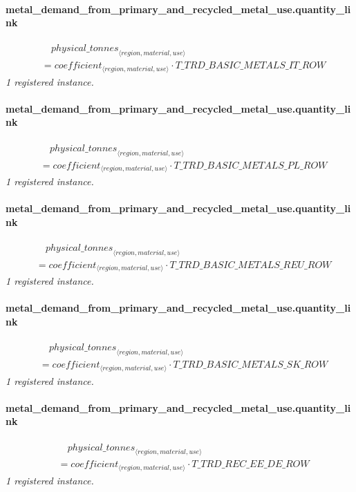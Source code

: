 \documentclass[11pt]{article}
\begin{document}
\paragraph{metal\_demand\_from\_primary\_and\_recycled\_metal\_use.quantity\_link}
\begin{align*}
&\quad {physical\_tonnes}_{\langle region, material, use\rangle}\\
&= coefficient_{\langle region, material, use\rangle} \cdot T\_TRD\_BASIC\_METALS\_IT\_ROW
\end{align*}
\noindent\emph{1 registered instance.}\par
\paragraph{metal\_demand\_from\_primary\_and\_recycled\_metal\_use.quantity\_link}
\begin{align*}
&\quad {physical\_tonnes}_{\langle region, material, use\rangle}\\
&= coefficient_{\langle region, material, use\rangle} \cdot T\_TRD\_BASIC\_METALS\_PL\_ROW
\end{align*}
\noindent\emph{1 registered instance.}\par
\paragraph{metal\_demand\_from\_primary\_and\_recycled\_metal\_use.quantity\_link}
\begin{align*}
&\quad {physical\_tonnes}_{\langle region, material, use\rangle}\\
&= coefficient_{\langle region, material, use\rangle} \cdot T\_TRD\_BASIC\_METALS\_REU\_ROW
\end{align*}
\noindent\emph{1 registered instance.}\par
\paragraph{metal\_demand\_from\_primary\_and\_recycled\_metal\_use.quantity\_link}
\begin{align*}
&\quad {physical\_tonnes}_{\langle region, material, use\rangle}\\
&= coefficient_{\langle region, material, use\rangle} \cdot T\_TRD\_BASIC\_METALS\_SK\_ROW
\end{align*}
\noindent\emph{1 registered instance.}\par
\paragraph{metal\_demand\_from\_primary\_and\_recycled\_metal\_use.quantity\_link}
\begin{align*}
&\quad {physical\_tonnes}_{\langle region, material, use\rangle}\\
&= coefficient_{\langle region, material, use\rangle} \cdot T\_TRD\_REC\_EE\_DE\_ROW
\end{align*}
\noindent\emph{1 registered instance.}\par
\end{document}
